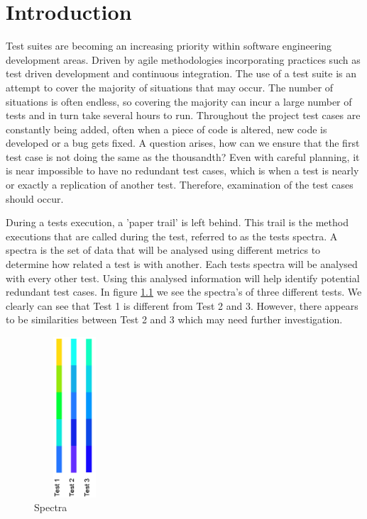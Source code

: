 \chapter{Introduction}\label{C:intro}

Test suites are becoming an increasing priority within software engineering development areas. Driven by agile methodologies incorporating practices such as test driven development and continuous integration. The use of a test suite is an attempt to cover the majority of situations that may occur. The number of situations is often endless, so covering the majority can incur a large number of tests and in turn take several hours to run. Throughout the project test cases are constantly being added, often when a piece of code is altered, new code is developed or a bug gets fixed. A question arises, how can we ensure that the first test case is not doing the same as the thousandth? Even with careful planning, it is near impossible to have no redundant test cases, which is when a test is nearly or exactly a replication of another test. Therefore, examination of the test cases should occur. 

During a tests execution, a 'paper trail' is left behind. This trail is the method executions that are called during the test, referred to as the tests spectra. A spectra is the set of data that will be analysed using different metrics to determine how related a test is with another. Each tests spectra will be analysed with every other test. Using this analysed information will help identify potential redundant test cases. In figure \ref{fig:spectra} we see the spectra's of three different tests. We clearly can see that Test 1 is different from Test 2 and 3. However, there appears to be similarities between Test 2 and 3 which may need further investigation.

\begin{figure}[h]
\includegraphics[width=3cm,height=6cm]{spectra.png}
\caption{Spectra}
\label{fig:spectra}
\end{figure}

